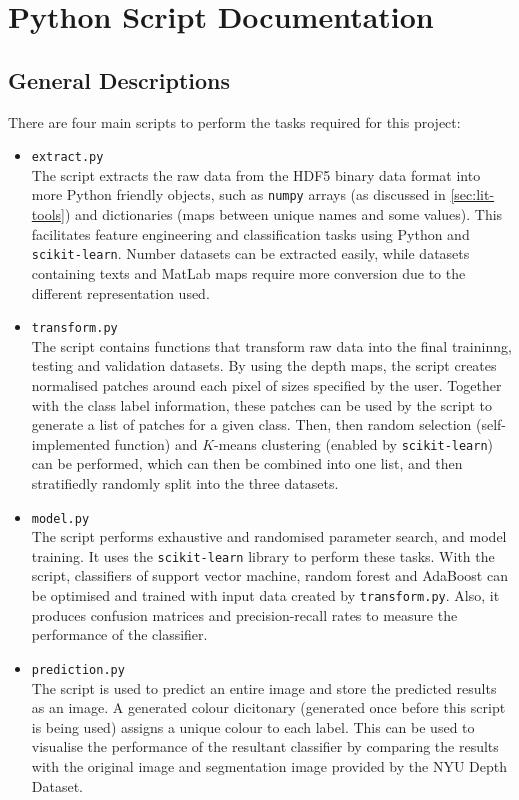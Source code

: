\appendix
\chapter{Python Script Documentation} \label{chap:appx}

\section{General Descriptions} \label{sec:appx-desc}
There are four main scripts to perform the tasks required for this project:

\begin{itemize}
  \item \texttt{extract.py} \\
    The script extracts the raw data from the HDF5 binary data format into more Python friendly objects, such as \texttt{numpy} arrays (as discussed in \autoref{sec:lit-tools}) and dictionaries (maps between unique names and some values). This facilitates feature engineering and classification tasks using Python and \texttt{scikit-learn}. Number datasets can be extracted easily, while datasets containing texts and MatLab maps require more conversion due to the different representation used.

  \item \texttt{transform.py} \\
    The script contains functions that transform raw data into the final traininng, testing and validation datasets. By using the depth maps, the script creates normalised patches around each pixel of sizes specified by the user. Together with the class label information, these patches can be used by the script to generate a list of patches for a given class. Then, then random selection (self-implemented function) and $K$-means clustering (enabled by \texttt{scikit-learn}) can be performed, which can then be combined into one list, and then stratifiedly randomly split into the three datasets.

  \item \texttt{model.py} \\
    The script performs exhaustive and randomised parameter search, and model training. It uses the \texttt{scikit-learn} library to perform these tasks. With the script, classifiers of support vector machine, random forest and AdaBoost can be optimised and trained with input data created by \texttt{transform.py}. Also, it produces confusion matrices and precision-recall rates to measure the performance of the classifier. 

  \item \texttt{prediction.py} \\
    The script is used to predict an entire image and store the predicted results as an image. A generated colour dicitonary (generated once before this script is being used) assigns a unique colour to each label. This can be used to visualise the performance of the resultant classifier by comparing the results with the original image and segmentation image provided by the NYU Depth Dataset.
\end{itemize}


